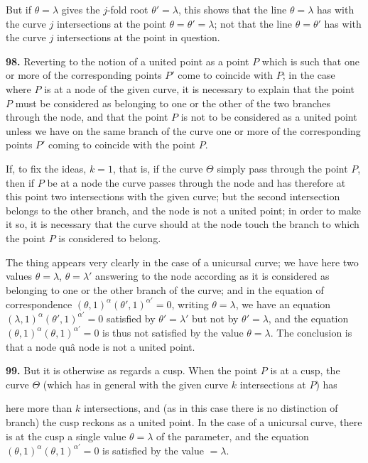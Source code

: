 \documentclass[11pt,a4paper]{article}
\theoremstyle{definition}
\begin{document}
But if $\theta = \lambda$ gives the $j$-fold root $\theta' = \lambda$, this shows that the line $\theta = \lambda$ has with the curve $j$ intersections at the point $\theta = \theta' = \lambda$; not that the line $\theta = \theta'$ has with the curve $j$ intersections at the point in question.

\noindent\textbf{98.} Reverting to the notion of a united point as a point $P$ which is such that one or more of the corresponding points $P'$ come to coincide with $P$; in the case where $P$ is at a node of the given curve, it is necessary to explain that the point $P$ must be considered as belonging to one or the other of the two branches through the node, and that the point $P$ is not to be considered as a united point unless we have on the same branch of the curve one or more of the corresponding points $P'$ coming to coincide with the point $P$.

If, to fix the ideas, $k = 1$, that is, if the curve $\Theta$ simply pass through the point $P$, then if $P$ be at a node the curve passes through the node and has therefore at this point two intersections with the given curve; but the second intersection belongs to the other branch, and the node is not a united point; in order to make it so, it is necessary that the curve should at the node touch the branch to which the point $P$ is considered to belong.

The thing appears very clearly in the case of a unicursal curve; we have here two values $\theta = \lambda$, $\theta = \lambda'$ answering to the node according as it is considered as belonging to one or the other branch of the curve; and in the equation of correspondence $(\theta, 1)^{\alpha}(\theta', 1)^{\alpha'} = 0$, writing $\theta = \lambda$, we have an equation $(\lambda, 1)^{\alpha}(\theta', 1)^{\alpha'} = 0$ satisfied by $\theta' = \lambda'$ but not by $\theta' = \lambda$, and the equation $(\theta, 1)^{\alpha}(\theta, 1)^{\alpha'} = 0$ is thus not satisfied by the value $\theta = \lambda$. The conclusion is that a node qu\^a node is not a united point.

\noindent\textbf{99.} But it is otherwise as regards a cusp. When the point $P$ is at a cusp, the curve $\Theta$ (which has in general with the given curve $k$ intersections at $P$) has


here more than $k$ intersections, and (as in this case there is no distinction of branch) the cusp reckons as a united point. In the case of a unicursal curve, there is at the cusp a single value $\theta = \lambda$ of the parameter, and the equation $(\theta, 1)^{\alpha}(\theta, 1)^{\alpha'} = 0$ is satisfied by the value $= \lambda$.
\end{document}
